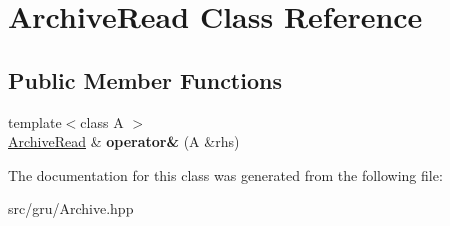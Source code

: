 \hypertarget{classArchiveRead}{\section{\-Archive\-Read \-Class \-Reference}
\label{classArchiveRead}
}
\subsection*{\-Public \-Member \-Functions}
\begin{DoxyCompactItemize}
\item 
\hypertarget{classArchiveRead_a776e35b241a26430d288a674454f032a}{{\footnotesize template$<$class A $>$ }\\\hyperlink{classArchiveRead}{\-Archive\-Read} \& {\bfseries operator\&} (\-A \&rhs)}\label{classArchiveRead_a776e35b241a26430d288a674454f032a}

\end{DoxyCompactItemize}


\-The documentation for this class was generated from the following file\-:\begin{DoxyCompactItemize}
\item 
src/gru/\-Archive.\-hpp\end{DoxyCompactItemize}
